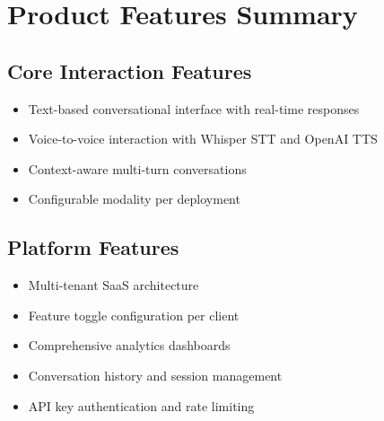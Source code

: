 \section{Product Features Summary}

\subsection{Core Interaction Features}
\begin{itemize}[leftmargin=*]
    \item Text-based conversational interface with real-time responses
    \item Voice-to-voice interaction with Whisper STT and OpenAI TTS
    \item Context-aware multi-turn conversations
    \item Configurable modality per deployment
\end{itemize}


\subsection{Platform Features}
\begin{itemize}[leftmargin=*]
    \item Multi-tenant SaaS architecture
    \item Feature toggle configuration per client
    \item Comprehensive analytics dashboards
    \item Conversation history and session management
    \item API key authentication and rate limiting
\end{itemize}
